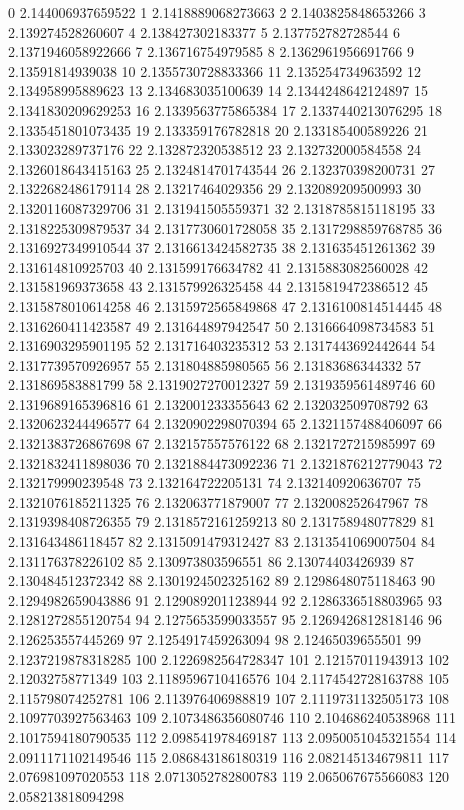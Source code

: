 0 2.144006937659522
1 2.1418889068273663
2 2.1403825848653266
3 2.139274528260607
4 2.138427302183377
5 2.137752782728544
6 2.1371946058922666
7 2.136716754979585
8 2.1362961956691766
9 2.13591814939038
10 2.1355730728833366
11 2.135254734963592
12 2.134958995889623
13 2.134683035100639
14 2.1344248642124897
15 2.1341830209629253
16 2.1339563775865384
17 2.1337440213076295
18 2.1335451801073435
19 2.133359176782818
20 2.133185400589226
21 2.133023289737176
22 2.132872320538512
23 2.132732000584558
24 2.1326018643415163
25 2.1324814701743544
26 2.132370398200731
27 2.1322682486179114
28 2.13217464029356
29 2.132089209500993
30 2.1320116087329706
31 2.131941505559371
32 2.1318785815118195
33 2.1318225309879537
34 2.1317730601728058
35 2.1317298859768785
36 2.1316927349910544
37 2.1316613424582735
38 2.131635451261362
39 2.131614810925703
40 2.131599176634782
41 2.1315883082560028
42 2.131581969373658
43 2.131579926325458
44 2.1315819472386512
45 2.1315878010614258
46 2.1315972565849868
47 2.1316100814514445
48 2.1316260411423587
49 2.131644897942547
50 2.1316664098734583
51 2.1316903295901195
52 2.131716403235312
53 2.1317443692442644
54 2.1317739570926957
55 2.131804885980565
56 2.13183686344332
57 2.131869583881799
58 2.1319027270012327
59 2.1319359561489746
60 2.1319689165396816
61 2.132001233355643
62 2.132032509708792
63 2.1320623244496577
64 2.1320902298070394
65 2.1321157488406097
66 2.1321383726867698
67 2.132157557576122
68 2.1321727215985997
69 2.1321832411898036
70 2.1321884473092236
71 2.1321876212779043
72 2.132179990239548
73 2.132164722205131
74 2.132140920636707
75 2.1321076185211325
76 2.132063771879007
77 2.132008252647967
78 2.1319398408726355
79 2.1318572161259213
80 2.131758948077829
81 2.131643486118457
82 2.1315091479312427
83 2.1313541069007504
84 2.131176378226102
85 2.130973803596551
86 2.13074403426939
87 2.130484512372342
88 2.1301924502325162
89 2.1298648075118463
90 2.1294982659043886
91 2.1290892011238944
92 2.1286336518803965
93 2.1281272855120754
94 2.1275653599033557
95 2.1269426812818146
96 2.126253557445269
97 2.1254917459263094
98 2.12465039655501
99 2.1237219878318285
100 2.1226982564728347
101 2.12157011943913
102 2.12032758771349
103 2.1189596710416576
104 2.1174542728163788
105 2.115798074252781
106 2.113976406988819
107 2.1119731132505173
108 2.1097703927563463
109 2.1073486356080746
110 2.104686240538968
111 2.1017594180790535
112 2.098541978469187
113 2.0950051045321554
114 2.0911171102149546
115 2.086843186180319
116 2.082145134679811
117 2.076981097020553
118 2.0713052782800783
119 2.065067675566083
120 2.058213818094298

